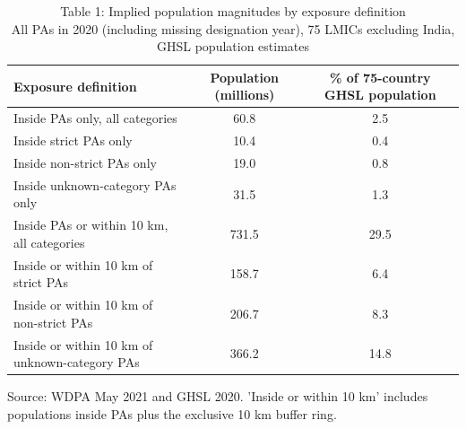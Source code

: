 \begin{table}[t]
\caption*{
{\fontsize{10}{13}\selectfont  Table 1: Implied population magnitudes by exposure definition\fontsize{8}{10}\selectfont } \\ 
{\fontsize{14}{17}\selectfont  All PAs in 2020 (including missing designation year), 75 LMICs excluding India, GHSL population estimates\fontsize{8}{10}\selectfont }
} 
\fontsize{8.0pt}{10.0pt}\selectfont
\begin{tabular*}{\linewidth}{@{\extracolsep{\fill}}lcc}
\toprule
Exposure definition & Population (millions) & \% of 75-country GHSL population \\ 
\midrule\addlinespace[2.5pt]
Inside PAs only, all categories & 60.8 & 2.5 \\ 
Inside strict PAs only & 10.4 & 0.4 \\ 
Inside non-strict PAs only & 19.0 & 0.8 \\ 
Inside unknown-category PAs only & 31.5 & 1.3 \\ 
Inside PAs or within 10 km, all categories & 731.5 & 29.5 \\ 
Inside or within 10 km of strict PAs & 158.7 & 6.4 \\ 
Inside or within 10 km of non-strict PAs & 206.7 & 8.3 \\ 
Inside or within 10 km of unknown-category PAs & 366.2 & 14.8 \\ 
\bottomrule
\end{tabular*}
\begin{minipage}{\linewidth}
Source: WDPA May 2021 and GHSL 2020. 'Inside or within 10 km' includes populations inside PAs plus the exclusive 10 km buffer ring.\\
\end{minipage}
\end{table}

